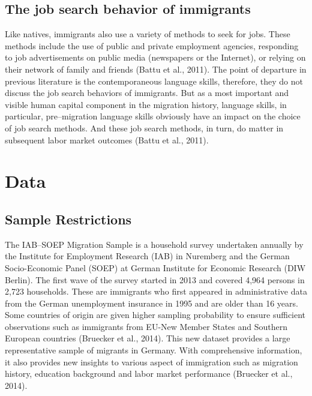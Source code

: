 \documentclass[12pt,a4paper]{article}
\begin{document}
\subsection{The job search behavior of immigrants}
Like natives, immigrants also use a variety of methods to seek for jobs. These methods include the use of public and private employment agencies, responding to job advertisements on public media (newspapers or the Internet), or relying on their network of family and friends (Battu et al., 2011). The point of departure in previous literature is the contemporaneous language skills, therefore, they do not discuss the job search behaviors of immigrants. But as a most important and visible human capital component in the migration history, language skills, in particular, pre--migration language skills obviously have an impact on the choice of job search methods. And these job search methods, in turn, do matter in subsequent labor market outcomes (Battu et al., 2011).  


\section{Data}
\subsection{Sample Restrictions}

The IAB--SOEP Migration Sample is a household survey undertaken annually by the Institute for Employment Research (IAB) in Nuremberg and the German Socio-Economic Panel (SOEP) at German Institute for Economic Research (DIW Berlin). The first wave of the survey started in 2013 and covered 4,964 persons in 2,723 households. These are immigrants who first appeared in administrative data from the German unemployment insurance in 1995 and are older than 16 years. Some countries of origin are given higher sampling probability to ensure sufficient observations such as immigrants from EU-New Member States and Southern European countries (Bruecker et al., 2014). This new dataset provides a large representative sample of migrants in Germany. With comprehensive information, it also provides new insights to various aspect of immigration such as migration history, education background and labor market performance (Bruecker et al., 2014).
\end{document}
